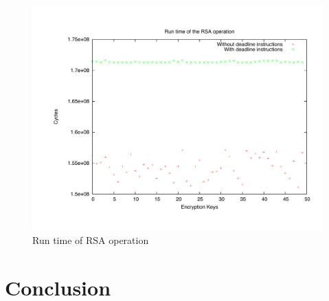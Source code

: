 \documentclass[times, 10pt,twocolumn]{article}
\begin{document}
\begin{figure}[ht]
  \centering
  \includegraphics[scale=.3]{./images/RSA.pdf}
  \caption{Run time of RSA operation}
  \label{fig:rsa}
\end{figure}


\section{Conclusion}




\end{document}
